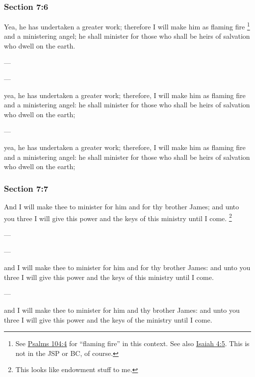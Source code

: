 	\subsubsection{Section 7:6} %
		\label{DC7-6}

		Yea, he has undertaken a greater work; therefore I will make him as flaming fire%
			\footnote{%
				See \hyperref[PSALMS-104-4]{Psalms 104:4} for ``flaming fire'' in this context. See also \hyperref[ISAIAH-4-5]{Isaiah 4:5}. This is not in the JSP or BC, of course.
				}
		and a ministering angel; he shall minister for those who shall be heirs of salvation who dwell on the earth.

		\begin{framed}
		\scriptsize
			\begin{compactdesc}
				\item[JSP] ---
				\item[BC] ---
				\item[DC 1835] yea, he has undertaken a greater work; therefore, I will make him as flaming fire and a ministering angel: he shall minister for those who shall be heirs of salvation who dwell on the earth;
				\item[FGW] ---
				\item[DC 1844] yea, he has undertaken a greater work; therefore, I will make him as flaming fire and a ministering angel: he shall minister for those who shall be heirs of salvation who dwell on the earth;
			\end{compactdesc}
		\end{framed}

	\subsubsection{Section 7:7} %
		\label{DC7-7}

		And I will make thee to minister for him and for thy brother James; and unto you three I will give this power and the keys of this ministry until I come.%
			\footnote{%
				This looks like endowment stuff to me. 
				}

		\begin{framed}
		\scriptsize
			\begin{compactdesc}
				\item[JSP] ---
				\item[BC] ---
				\item[DC 1835] and I will make thee to minister for him and for thy brother James: and unto you three I will give this power and the keys of this ministry until I come.
				\item[FGW] ---
				\item[DC 1844] and I will make thee to minister for him and thy brother James: and unto you three I will give this power and the keys of the ministry until I come.
			\end{compactdesc}
		\end{framed}

